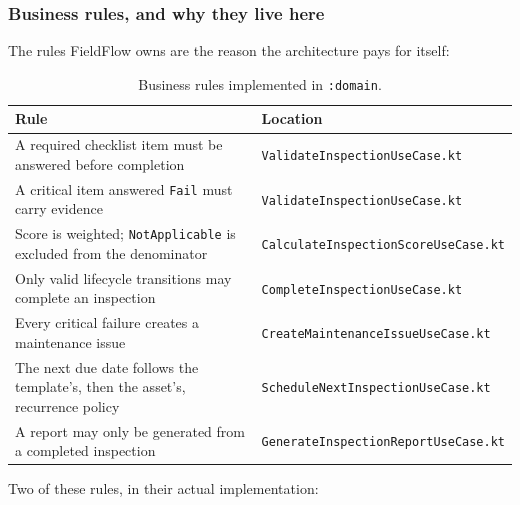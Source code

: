 \documentclass[11pt,a4paper]{article}
\newcommand{\mdl}[1]{\texttt{#1}}
\newcommand{\file}[1]{{\small\texttt{#1}}}
\begin{document}
\subsubsection{Business rules, and why they live here}

The rules FieldFlow owns are the reason the architecture pays for itself:

\begin{table}[H]
\centering
\small
\begin{tabularx}{\linewidth}{@{}p{5.4cm} X@{}}
\toprule
\textbf{Rule} & \textbf{Location} \\
\midrule
A required checklist item must be answered before completion & \file{ValidateInspectionUseCase.kt} \\
A critical item answered \texttt{Fail} must carry evidence & \file{ValidateInspectionUseCase.kt} \\
Score is weighted; \texttt{NotApplicable} is excluded from the denominator & \file{CalculateInspectionScoreUseCase.kt} \\
Only valid lifecycle transitions may complete an inspection & \file{CompleteInspectionUseCase.kt} \\
Every critical failure creates a maintenance issue & \file{CreateMaintenanceIssueUseCase.kt} \\
The next due date follows the template's, then the asset's, recurrence policy & \file{ScheduleNextInspectionUseCase.kt} \\
A report may only be generated from a completed inspection & \file{GenerateInspectionReportUseCase.kt} \\
\bottomrule
\end{tabularx}
\caption{Business rules implemented in \mdl{:domain}.}
\end{table}

Two of these rules, in their actual implementation:
\end{document}
